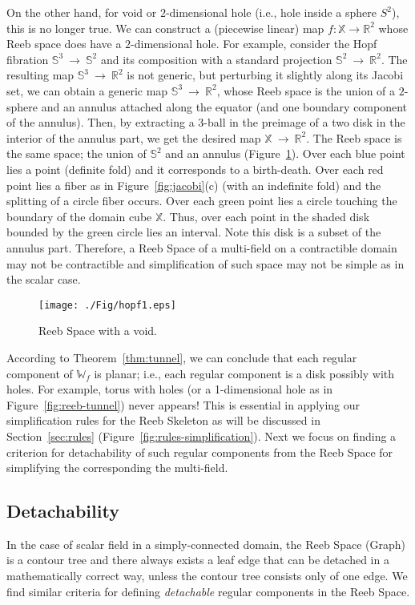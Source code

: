 \documentclass[twocolumn]{article}
\newcommand{\X}{\mathbb{X}}
\newcommand{\R}{\mathbb{R}}
\newcommand{\Sp}{\mathbb{S}}
\newcommand{\RS}{\mathbb{W}_f}
\begin{document}
On the other hand, for void or $2$-dimensional hole (i.e., hole inside a sphere $S^2$),
this is no longer true. We can construct a (piecewise
linear) map $f : \X \rightarrow \R^2$ whose Reeb space does have
a $2$-dimensional hole. For example, consider the Hopf
fibration $\Sp^3~\rightarrow~\Sp^2$ and its composition with
a standard projection $\Sp^2~\rightarrow~\R^2$. The resulting map
$\Sp^3~\rightarrow~\R^2$ is not generic, but perturbing
it slightly along its Jacobi set, we can obtain
a generic map $\Sp^3~\rightarrow~\R^2$, whose Reeb space is
the union of a $2$-sphere and an annulus attached
along the equator (and one boundary component of
the annulus). Then, by extracting a 3-ball
in the preimage of a two disk in the interior
of the annulus part, we get the desired map $\X~\rightarrow~\R^2$.
The Reeb space is the same space; the union of
$\Sp^2$ and an annulus (Figure~\ref{fig:hopf}).
Over each blue point lies a point (definite fold)
and it corresponds to a birth-death.
Over each red point lies a fiber as in Figure~\ref{fig:jacobi}(c) (with an
indefinite fold) and the splitting of a circle fiber
occurs. Over each green point lies a circle touching the
boundary of the domain cube $\X$. Thus,
over each point in the shaded disk bounded
by the green circle lies an interval.
 Note this disk is a subset of the
annulus part. Therefore, a Reeb Space of a multi-field
on a contractible domain may not be contractible and 
simplification of such space may not be simple as in 
the scalar case. 
\begin{figure}[t!]
\begin{center}
\texttt{[image: ./Fig/hopf1.eps]}
\caption{Reeb Space with a void.}
\label{fig:hopf}
\end{center}
\end{figure} 

According to Theorem~\ref{thm:tunnel},
we can conclude that each regular component of $\RS$ is
planar; i.e., each regular component is a disk possibly with
holes. For example, torus with holes (or a 1-dimensional hole as in Figure~\ref{fig:reeb-tunnel}) never appears!
This is essential in applying our simplification
rules for the Reeb Skeleton as will be discussed in
Section~\ref{sec:rules} (Figure~\ref{fig:rules-simplification}).
Next we focus on finding a criterion for detachability of such regular
components from the Reeb Space for simplifying the 
corresponding the multi-field. 


\subsection{Detachability}
\label{subsec:detach}
In the case of scalar field in a simply-connected domain,
the Reeb Space (Graph) is a contour tree and there always exists a leaf edge that can be
detached in a mathematically correct way,
unless the contour tree consists only of one edge.
We find similar criteria for defining
\emph{detachable} regular components in the Reeb Space.
\end{document}
